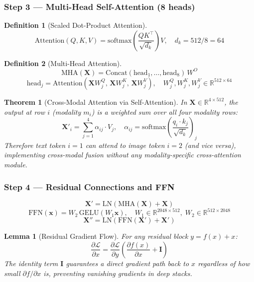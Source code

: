\documentclass[12pt, a4paper]{article}
\theoremstyle{definition}
\newtheorem{definition}{Definition}[section]
\theoremstyle{plain}
\newtheorem{theorem}{Theorem}[section]
\newtheorem{lemma}{Lemma}[section]
\theoremstyle{remark}
\begin{document}
\subsubsection{Step 3 --- Multi-Head Self-Attention (8 heads)}

\begin{definition}[Scaled Dot-Product Attention]
\[
  \mathrm{Attention}(Q,K,V) =
  \mathrm{softmax}\!\left(\frac{QK^\top}{\sqrt{d_k}}\right)V,
  \quad d_k = 512/8 = 64
\]
\end{definition}

\begin{definition}[Multi-Head Attention]
\[
  \mathrm{MHA}(\mathbf{X}) = \mathrm{Concat}(\text{head}_1,\ldots,\text{head}_8)\,W^O
\]
\[
  \text{head}_j = \mathrm{Attention}(\mathbf{X}W^Q_j,\,\mathbf{X}W^K_j,\,\mathbf{X}W^V_j),
  \quad W^Q_j,W^K_j,W^V_j\in\mathbb{R}^{512\times64}
\]
\end{definition}

\begin{theorem}[Cross-Modal Attention via Self-Attention]
\label{thm:crossmodal}
In $\mathbf{X}\in\mathbb{R}^{4\times512}$, the output at row $i$ (modality
$m_i$) is a weighted sum over all four modality rows:
\[
  \mathbf{X}'_i = \sum_{j=1}^{4}\alpha_{ij}\cdot V_j,\quad
  \alpha_{ij} = \mathrm{softmax}\!\left(\frac{q_i\cdot k_j}{\sqrt{d_k}}\right)_j
\]
Therefore text token $i=1$ can attend to image token $i=2$ (and vice versa),
implementing cross-modal fusion without any modality-specific cross-attention
module.
\end{theorem}

\subsubsection{Step 4 --- Residual Connections and FFN}

\[
  \mathbf{X}' = \mathrm{LN}\!\left(\mathrm{MHA}(\mathbf{X}) + \mathbf{X}\right)
\]
\[
  \mathrm{FFN}(\mathbf{x}) = W_2\,\mathrm{GELU}(W_1\mathbf{x}),\quad
  W_1\!\in\!\mathbb{R}^{2048\times512},\;W_2\!\in\!\mathbb{R}^{512\times2048}
\]
\[
  \mathbf{X}'' = \mathrm{LN}\!\left(\mathrm{FFN}(\mathbf{X}') + \mathbf{X}'\right)
\]

\begin{lemma}[Residual Gradient Flow]
\label{lem:residual}
For any residual block $y = f(x) + x$:
\[
  \frac{\partial\mathcal{L}}{\partial x} =
  \frac{\partial\mathcal{L}}{\partial y}
  \left(\frac{\partial f(x)}{\partial x} + \mathbf{I}\right)
\]
The identity term $\mathbf{I}$ guarantees a direct gradient path back to $x$
regardless of how small $\partial f/\partial x$ is, preventing vanishing
gradients in deep stacks.
\end{lemma}
\end{document}
